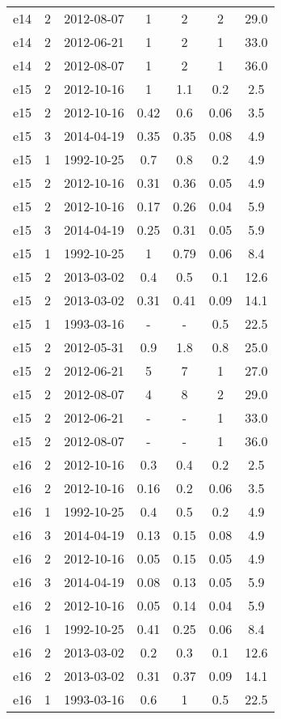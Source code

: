 \begin{longtable}{ccccccc}
e14 & 2 & 2012-08-07 & 1 & 2 & 2 & 29.0 \\
e14 & 2 & 2012-06-21 & 1 & 2 & 1 & 33.0 \\
e14 & 2 & 2012-08-07 & 1 & 2 & 1 & 36.0 \\
e15 & 2 & 2012-10-16 & 1 & 1.1 & 0.2 & 2.5 \\
e15 & 2 & 2012-10-16 & 0.42 & 0.6 & 0.06 & 3.5 \\
e15 & 3 & 2014-04-19 & 0.35 & 0.35 & 0.08 & 4.9 \\
e15 & 1 & 1992-10-25 & 0.7 & 0.8 & 0.2 & 4.9 \\
e15 & 2 & 2012-10-16 & 0.31 & 0.36 & 0.05 & 4.9 \\
e15 & 2 & 2012-10-16 & 0.17 & 0.26 & 0.04 & 5.9 \\
e15 & 3 & 2014-04-19 & 0.25 & 0.31 & 0.05 & 5.9 \\
e15 & 1 & 1992-10-25 & 1 & 0.79 & 0.06 & 8.4 \\
e15 & 2 & 2013-03-02 & 0.4 & 0.5 & 0.1 & 12.6 \\
e15 & 2 & 2013-03-02 & 0.31 & 0.41 & 0.09 & 14.1 \\
e15 & 1 & 1993-03-16 & - & - & 0.5 & 22.5 \\
e15 & 2 & 2012-05-31 & 0.9 & 1.8 & 0.8 & 25.0 \\
e15 & 2 & 2012-06-21 & 5 & 7 & 1 & 27.0 \\
e15 & 2 & 2012-08-07 & 4 & 8 & 2 & 29.0 \\
e15 & 2 & 2012-06-21 & - & - & 1 & 33.0 \\
e15 & 2 & 2012-08-07 & - & - & 1 & 36.0 \\
e16 & 2 & 2012-10-16 & 0.3 & 0.4 & 0.2 & 2.5 \\
e16 & 2 & 2012-10-16 & 0.16 & 0.2 & 0.06 & 3.5 \\
e16 & 1 & 1992-10-25 & 0.4 & 0.5 & 0.2 & 4.9 \\
e16 & 3 & 2014-04-19 & 0.13 & 0.15 & 0.08 & 4.9 \\
e16 & 2 & 2012-10-16 & 0.05 & 0.15 & 0.05 & 4.9 \\
e16 & 3 & 2014-04-19 & 0.08 & 0.13 & 0.05 & 5.9 \\
e16 & 2 & 2012-10-16 & 0.05 & 0.14 & 0.04 & 5.9 \\
e16 & 1 & 1992-10-25 & 0.41 & 0.25 & 0.06 & 8.4 \\
e16 & 2 & 2013-03-02 & 0.2 & 0.3 & 0.1 & 12.6 \\
e16 & 2 & 2013-03-02 & 0.31 & 0.37 & 0.09 & 14.1 \\
e16 & 1 & 1993-03-16 & 0.6 & 1 & 0.5 & 22.5 \\

\end{longtable}

